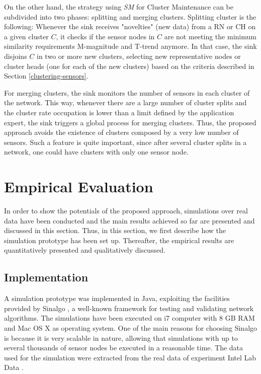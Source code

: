 \documentclass[conference]{IEEEtran}
\begin{document}

On the other hand, the strategy using \textit{SM} for Cluster Maintenance can be
subdivided into two phases: splitting and merging clusters. Splitting cluster is
the following:
Whenever the sink receives "novelties" (new data) from a RN or CH on a given
cluster $C$, it checks if the sensor nodes in $C$ are not meeting the minimum
similarity requirements M-magnitude and T-trend anymore. In that case, the sink
disjoins $C$ in two or more new clusters, selecting new representative nodes or
cluster heads (one for each of the new clusters) based on the criteria described
in Section \ref{clustering-sensors}.

For merging clusters, the sink monitors the number of sensors in each cluster of
the network. This way, whenever there are a large number of cluster splits and
the cluster rate occupation is lower than a limit defined by the application
expert, the sink triggers a global process for merging clusters. Thus, the
proposed approach avoids the existence of clusters composed by a very low number
of sensors. Such a feature is quite important, since after several cluster
splits in a network, one could have clusters with only one sensor node.

\section{Empirical Evaluation}
\label{eval}

In order to show the potentials of the proposed approach, simulations over real
data have been conducted and the main results achieved so far are presented and
discussed in this section. Thus, in this section, we first describe how the
simulation prototype has been set up. Thereafter, the empirical results are
quantitatively presented and qualitatively discussed.

\subsection{Implementation}
\label{implementation}

A simulation prototype was implemented in Java, exploiting the facilities
provided by Sinalgo \cite{Sinalgo2007}, a well-known framework for testing and
validating network algorithms. The simulations have been executed on i7 computer
with 8 GB RAM and Mac OS X as operating system.
One of the main reasons for choosing Sinalgo is because it is very scalable in
nature, allowing that simulations with up to several thousands of sensor nodes
be executed in a reasonable time. The data used for the simulation were
extracted from the real data of experiment Intel Lab Data \cite{Intel2004}. 
\end{document}
